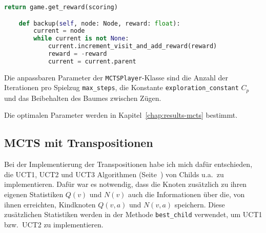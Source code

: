 \begin{lstlisting}[language=Python,caption=Die MCTSPlayer Klasse,label={lst:mcts-player}]
        return game.get_reward(scoring)

    def backup(self, node: Node, reward: float):
        current = node
        while current is not None:
            current.increment_visit_and_add_reward(reward)
            reward = -reward
            current = current.parent

\end{lstlisting}

Die anpassbaren Parameter der \verb|MCTSPlayer|-Klasse sind die Anzahl der Iterationen pro Spielzug \verb|max_steps|, die Konstante \verb|exploration_constant| $C_p$ und das Beibehalten des Baumes zwischen Zügen.

Die optimalen Parameter werden in Kapitel~\ref{chap:results-mcts} bestimmt.

\subsection{MCTS mit Transpositionen}
\label{subsec:mcts-mit-transpositionen}

Bei der Implementierung der Transpositionen habe ich mich dafür entschieden, die UCT1, UCT2 und UCT3 Algorithmen (Seite~\pageref{eqn:UCT1}) von Childs u.a.\ zu implementieren.
Dafür war es notwendig, dass die Knoten zusätzlich zu ihren eigenen Statistiken $Q(v)$ und $N(v)$ auch die Informationen über die, von ihnen erreichten, Kindknoten $Q(v,a)$ und $N(v,a)$ speichern.
Diese zusätzlichen Statistiken werden in der Methode \verb|best_child| verwendet, um UCT1 bzw.\ UCT2 zu implementieren.

